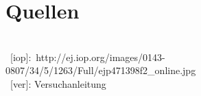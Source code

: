 \clearpage
\section{Quellen}
~\\
~[iop]:~http://ej.iop.org/images/0143-0807/34/5/1263/Full/ejp471398f2\_online.jpg\\
\noindent
~[ver]: Versuchanleitung